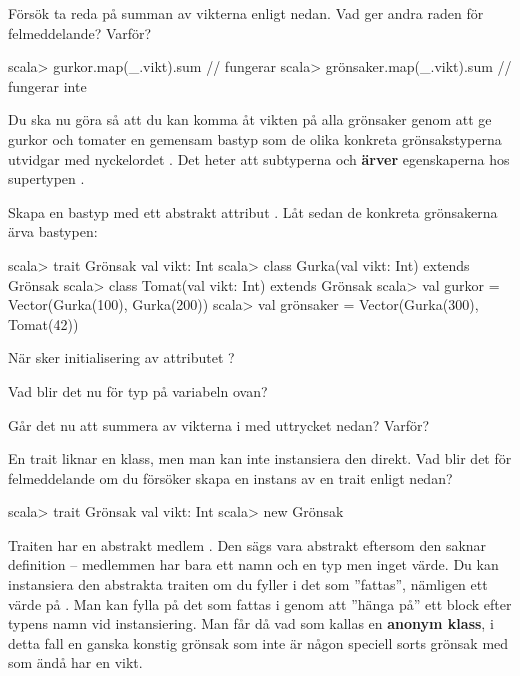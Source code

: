 \Subtask Försök ta reda på summan av vikterna enligt nedan. Vad ger andra raden för felmeddelande? Varför?

\begin{REPL}
scala> gurkor.map(_.vikt).sum     // fungerar
scala> grönsaker.map(_.vikt).sum  // fungerar inte
\end{REPL}

\Subtask Du ska nu göra så att du kan komma åt vikten på alla grönsaker genom att ge gurkor och tomater en gemensam bastyp som de olika konkreta grönsakstyperna utvidgar med nyckelordet . Det heter att subtyperna  och  \textbf{ärver} egenskaperna hos supertypen .

Skapa en bastyp  med ett abstrakt attribut . Låt sedan de konkreta grönsakerna ärva bastypen:

\begin{REPL}
scala> trait Grönsak { val vikt: Int }
scala> class Gurka(val vikt: Int) extends Grönsak
scala> class Tomat(val vikt: Int) extends Grönsak
scala> val gurkor = Vector(Gurka(100), Gurka(200))
scala> val grönsaker = Vector(Gurka(300), Tomat(42))
\end{REPL}
När sker initialisering av attributet ?

\Subtask Vad blir det nu för typ på variabeln  ovan?

\Subtask Går det nu att summera av vikterna i  med uttrycket nedan? Varför?\\ 


\Subtask En trait liknar en klass, men man kan inte instansiera den direkt. Vad blir det för felmeddelande om du försöker skapa en instans av en trait enligt nedan?
\begin{REPL}
scala> trait Grönsak { val vikt: Int }
scala> new Grönsak
\end{REPL}


\Subtask Traiten  har en abstrakt medlem . Den sägs vara abstrakt eftersom den saknar definition -- medlemmen har bara ett namn och en typ men inget värde. Du kan instansiera den abstrakta traiten  om du fyller i det som ''fattas'', nämligen ett värde på . Man kan fylla på det som fattas i genom att ''hänga på'' ett block efter typens namn vid instansiering. Man får då vad som kallas en \textbf{anonym klass}, i detta fall en ganska konstig grönsak som inte är någon speciell sorts grönsak med som ändå har en vikt.

